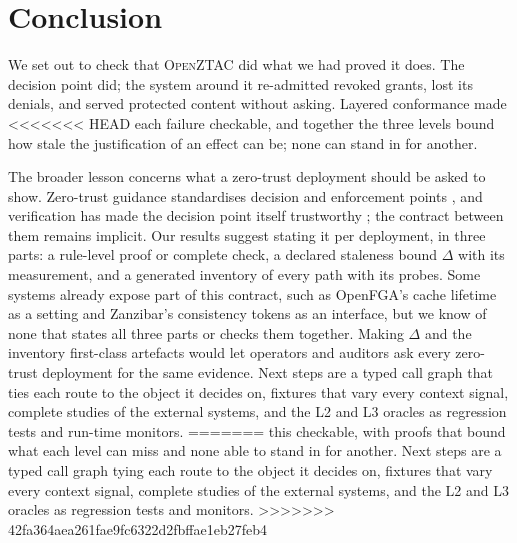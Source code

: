 \documentclass[sigconf,review,anonymous]{acmart}
\newcommand{\sysname}{\textsc{OpenZTAC}\xspace}
\newcommand{\sysname}{\textsc{Atrium}\xspace}
\newcommand{\sysname}{\textsc{OpenZTAC}\xspace}
\begin{document}
\section{Conclusion}

We set out to check that \sysname did what we had proved it does. The decision point did; the system around it
re-admitted revoked grants, lost its denials, and served protected content without asking. Layered conformance made
<<<<<<< HEAD
each failure checkable, and together the three levels bound how stale the justification of an effect can be; none can
stand in for another.

The broader lesson concerns what a zero-trust deployment should be asked to show. Zero-trust guidance standardises
decision and enforcement points \cite{rose2020zta}, and verification has made the decision point itself trustworthy
\cite{cutler2024cedar}; the contract between them remains implicit. Our results suggest stating it per deployment,
in three parts: a rule-level proof or complete check, a declared staleness bound $\Delta$ with its measurement, and a
generated inventory of every path with its probes. Some systems already expose part of this contract, such as
OpenFGA's cache lifetime as a setting and Zanzibar's consistency tokens as an interface, but we know of none that
states all three parts or checks them together. Making $\Delta$ and the inventory first-class artefacts would let
operators and auditors ask every zero-trust deployment for the same evidence. Next steps are a typed call graph that
ties each route to the object it decides on, fixtures that vary every context signal, complete studies of the
external systems, and the L2 and L3 oracles as regression tests and run-time monitors.
=======
this checkable, with proofs that bound what each level can miss and none able to stand in for another. Next steps
are a typed call graph tying each route to the object it decides on, fixtures that vary every context signal,
complete studies of the external systems, and the L2 and L3 oracles as regression tests and monitors.
>>>>>>> 42fa364aea261fae9fc6322d2fbffae1eb27feb4

\end{document}

